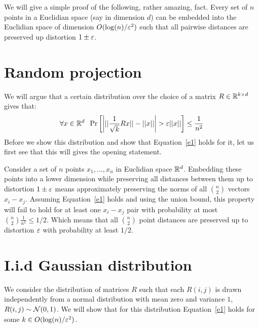 \documentclass{article}
\begin{document}


We will give a simple proof of the following, rather amazing, fact. Every set of $n$ points 
in a Euclidian space (say in dimension $d$) can be embedded into the Euclidian space of 
dimension $O(\log(n)/\varepsilon^2)$ such that all pairwise distances are preserved up distortion $1\pm \varepsilon$.

\section*{Random projection}
We will argue that a certain distribution over the choice of a matrix $R \in {\mathbb{R}}^{k \times d}$ gives that:
\begin{equation}
\label{e1}
\forall x \in {\mathbb{R}}^{d} \;\; \Pr\left[ \left| ||\frac{1}{\sqrt{k}}Rx|| - ||x|| \right| > \varepsilon||x|| \right] \le \frac{1}{n^2} 
\end{equation}
Before we show this distribution and show that Equation~\ref{e1} holds for it, let us first see
that this will gives the opening statement. 

Consider a set of $n$ points $x_1,\ldots, x_n$ in Euclidian space ${\mathbb{R}}^d$. Embedding these points
into a lower dimension while preserving all distances between
them up to distortion $1\pm \varepsilon$ means approximately preserving the norms of all 
${n \choose 2}$ vectors $x_i - x_j$. Assuming Equation~\ref{e1} holds and using the union 
bound, this property will fail to hold for at least one $x_i - x_j$ pair with probability at most ${n \choose 2}\frac{1}{n^2} \le 1/2$.
Which means that all ${n \choose 2}$ point distances are preserved up to distortion $\varepsilon$ with probability at least $1/2$.


\section{I.i.d Gaussian distribution}
We consider the distribution of matrices $R$ such that each $R(i,j)$ is drawn independently from  a
normal distribution with mean zero and variance $1$, $R(i,j) \sim {\mathcal{N}}(0,1)$. We will show that for this
distribution Equation~\ref{e1} holds for some $k \in O(\log(n)/\varepsilon^2)$.
\end{document}
